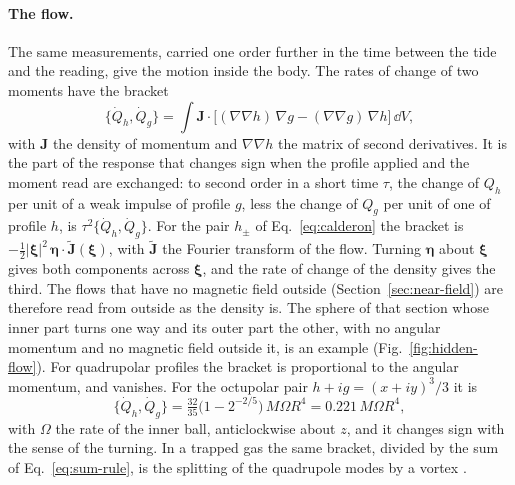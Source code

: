 \paragraph{The flow.} The same measurements, carried one order further in the
time between the tide and the reading, give the motion inside the body. The
rates of change of two moments have the bracket
\begin{equation}\label{eq:flow-bracket}
\{\dot Q_h, \dot Q_g\} = \int\mathbf J\cdot\bigl[(\nabla\nabla h)\,\nabla g
- (\nabla\nabla g)\,\nabla h\bigr]\,\dd V ,
\end{equation}
with $\mathbf J$ the density of momentum and $\nabla\nabla h$ the matrix of
second derivatives. It is the part of the response that changes sign when the
profile applied and the moment read are exchanged: to second order in a short
time $\tau$, the change of $Q_h$ per unit of a weak impulse of profile $g$, less the
change of $Q_g$ per unit of one of profile $h$, is $\tau^2\{\dot Q_h, \dot Q_g\}$.
For the pair $h_\pm$ of Eq.~\eqref{eq:calderon} the bracket is
$-\tfrac12|\boldsymbol\xi|^2\,\boldsymbol\eta\cdot\tilde{\mathbf J}(\boldsymbol\xi)$,
with $\tilde{\mathbf J}$ the Fourier transform of the flow. Turning
$\boldsymbol\eta$ about $\boldsymbol\xi$ gives both components across
$\boldsymbol\xi$, and the rate of change of the density gives the third. The
flows that have no magnetic field outside (Section~\ref{sec:near-field}) are
therefore read from outside as the density is. The sphere of that section
whose inner part turns one way and its outer part the other, with no angular
momentum and no magnetic field outside it, is an example
(Fig.~\ref{fig:hidden-flow}). For quadrupolar
profiles the bracket is proportional to the angular momentum, and vanishes.
For the octupolar pair $h + ig = (x + iy)^3/3$ it is
\begin{equation}\label{eq:hidden-spin}
\{\dot Q_h, \dot Q_g\} = \tfrac{32}{35}\bigl(1 - 2^{-2/5}\bigr)\,M\Omega R^4
= 0.221\,M\Omega R^4 ,
\end{equation}
with $\Omega$ the rate of the inner ball, anticlockwise about $z$, and it changes sign with the sense of the
turning. In a trapped gas the same bracket, divided by the sum of
Eq.~\eqref{eq:sum-rule}, is the splitting of the quadrupole modes by a vortex
\cite{ZambelliStringari1998}.

